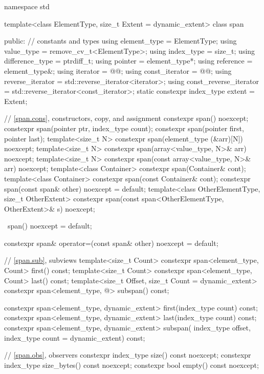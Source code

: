 %
\begin{codeblock}
namespace std {
  template<class ElementType, size_t Extent = dynamic_extent>
  class span {
  public:
    // constants and types
    using element_type = ElementType;
    using value_type = remove_cv_t<ElementType>;
    using index_type = size_t;
    using difference_type = ptrdiff_t;
    using pointer = element_type*;
    using reference = element_type&;
    using iterator = @@;
    using const_iterator = @@;
    using reverse_iterator = std::reverse_iterator<iterator>;
    using const_reverse_iterator = std::reverse_iterator<const_iterator>;
    static constexpr index_type extent = Extent;

    // \ref{span.cons}, constructors, copy, and assignment
    constexpr span() noexcept;
    constexpr span(pointer ptr, index_type count);
    constexpr span(pointer first, pointer last);
    template<size_t N>
      constexpr span(element_type (&arr)[N]) noexcept;
    template<size_t N>
      constexpr span(array<value_type, N>& arr) noexcept;
    template<size_t N>
      constexpr span(const array<value_type, N>& arr) noexcept;
    template<class Container>
      constexpr span(Container& cont);
    template<class Container>
      constexpr span(const Container& cont);
    constexpr span(const span& other) noexcept = default;
    template<class OtherElementType, size_t OtherExtent>
      constexpr span(const span<OtherElementType, OtherExtent>& s) noexcept;

    ~span() noexcept = default;

    constexpr span& operator=(const span& other) noexcept = default;

    // \ref{span.sub}, subviews
    template<size_t Count>
      constexpr span<element_type, Count> first() const;
    template<size_t Count>
      constexpr span<element_type, Count> last() const;
    template<size_t Offset, size_t Count = dynamic_extent>
      constexpr span<element_type, @\seebelow@> subspan() const;

    constexpr span<element_type, dynamic_extent> first(index_type count) const;
    constexpr span<element_type, dynamic_extent> last(index_type count) const;
    constexpr span<element_type, dynamic_extent> subspan(
      index_type offset, index_type count = dynamic_extent) const;

    // \ref{span.obs}, observers
    constexpr index_type size() const noexcept;
    constexpr index_type size_bytes() const noexcept;
    constexpr bool empty() const noexcept;

}}
\end{codeblock}
